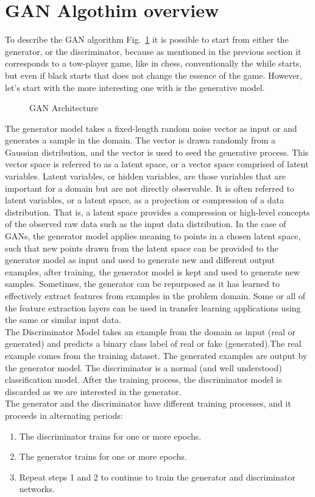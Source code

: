 \section{GAN Algothim overview}
\label{sec:GAN_algorithm}
To describe the GAN algorithm Fig.~\ref{fig:GAN} it is possible to start from either the generator, or the discriminator, because as mentioned in the previous section it corresponds to a tow-player game, like in chess, conventionally the while starts, but even if black starts that does not change the essence of the game. However, let's start with the more interesting one with is the generative model.\\

\begin{figure}
	\centerline
	\GAN
	\caption{GAN Architecture}
	\label{fig:GAN}
\end{figure} 
The generator model takes a fixed-length random noise vector as input or and generates a sample in the domain. The vector is drawn randomly from a Gaussian distribution, and the vector is used to seed the generative process. This vector space is referred to as a latent space, or a vector space comprised of latent variables. Latent variables, or hidden variables, are those variables that are important for a domain but are not directly observable. It is often referred to latent variables, or a latent space, as a projection or compression of a data distribution. That is, a latent space provides a compression or high-level concepts of the observed raw data such as the input data distribution. In the case of GANs, the generator model applies meaning to points in a chosen latent space, such that new points drawn from the latent space can be provided to the generator model as input and used to generate new and different output examples, 
after training, the generator model is kept and used to generate new samples. Sometimes, the generator can be repurposed as it has learned to effectively extract features from examples in the problem domain. Some or all of the feature extraction layers can be used in transfer learning applications using the same or similar input data. \\

The Discriminator Model takes an example from the domain as input (real or generated) and predicts a binary class label of real or fake (generated).The real example comes from the training dataset. The generated examples are output by the generator model. The discriminator is a normal (and well understood) classification model. After the training process, the discriminator model is discarded as we are interested in the generator.\\
The generator and the discriminator have different training processes, and it proceeds in alternating periods:
\begin{enumerate}
	\item The discriminator trains for one or more epochs.
	\item The generator trains for one or more epochs.
	\item Repeat steps 1 and 2 to continue to train the generator and discriminator networks.
\end{enumerate}

